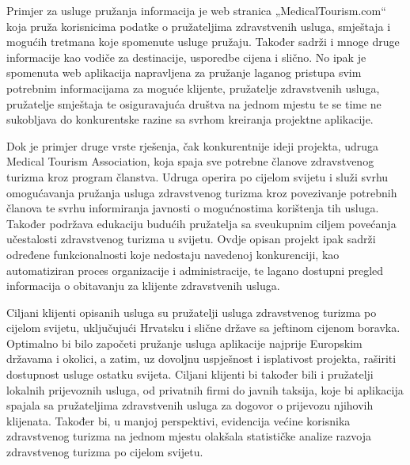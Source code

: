		Primjer za usluge pružanja informacija je web stranica „MedicalTourism.com“ koja pruža korisnicima podatke o pružateljima zdravstvenih usluga, smještaja i mogućih tretmana koje spomenute usluge pružaju. Također sadrži i mnoge druge informacije kao vodiče za destinacije, usporedbe cijena i slično. No ipak je spomenuta web aplikacija napravljena za pružanje laganog pristupa svim potrebnim informacijama za moguće klijente, pružatelje zdravstvenih usluga, pružatelje smještaja te osiguravajuća društva na jednom mjestu te se time ne sukobljava do konkurentske razine sa svrhom kreiranja projektne aplikacije.
		
		
		Dok je primjer druge vrste rješenja, čak konkurentnije ideji projekta, udruga Medical Tourism Association, koja spaja sve potrebne članove zdravstvenog turizma kroz program članstva. Udruga operira po cijelom svijetu i služi svrhu omogućavanja pružanja usluga zdravstvenog turizma kroz povezivanje potrebnih članova te svrhu informiranja javnosti o mogućnostima korištenja tih usluga. Također podržava edukaciju budućih pružatelja sa sveukupnim ciljem povećanja učestalosti zdravstvenog turizma u svijetu. Ovdje opisan projekt ipak sadrži određene funkcionalnosti koje nedostaju navedenoj konkurenciji, kao automatiziran proces organizacije i administracije, te lagano dostupni pregled informacija o obitavanju za klijente zdravstvenih usluga.
		
		
		
		
		\break
		Ciljani klijenti opisanih usluga su pružatelji usluga zdravstvenog turizma po cijelom svijetu, uključujući Hrvatsku i slične države sa jeftinom cijenom boravka. Optimalno bi bilo započeti pružanje usluga aplikacije najprije Europskim državama i okolici, a zatim, uz dovoljnu uspješnost i isplativost projekta, raširiti dostupnost usluge ostatku svijeta. Ciljani klijenti bi također bili i pružatelji lokalnih prijevoznih usluga, od privatnih firmi do javnih taksija, koje bi aplikacija spajala sa pružateljima zdravstvenih usluga za dogovor o prijevozu njihovih klijenata. Također bi, u manjoj perspektivi, evidencija većine korisnika zdravstvenog turizma na jednom mjestu olakšala statističke analize razvoja zdravstvenog turizma po cijelom svijetu.
		
